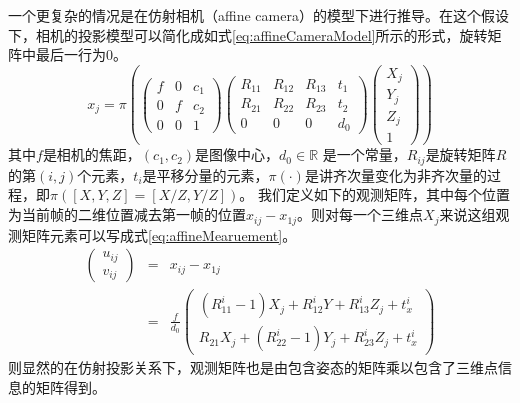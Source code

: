 一个更复杂的情况是在仿射相机（affine camera）的模型下进行推导\cite{wx-ref}。在这个假设下，相机的投影模型可以简化成如式\eqref{eq:affineCameraModel}所示的形式，旋转矩阵中最后一行为0。
\begin{equation}\label{eq:affineCameraModel}
x_j=\pi
(
\begin{pmatrix}
f & 0 & c_1\\
0 & f& c_2\\
0 & 0 &1
\end{pmatrix}
\begin{pmatrix}
R_{11} & R_{12} & R_{13} & t_1\\
R_{21} & R_{22} & R_{23} & t_2\\
0      & 0      & 0      & d_0
\end{pmatrix}
\begin{pmatrix}
X_j\\Y_j\\Z_j\\1
\end{pmatrix}
)
\end{equation}
其中$f$是相机的焦距，$(c_1,c_2)$是图像中心，$d_0\in \mathbb{R}$ 是一个常量，$R_{ij}$是旋转矩阵$R$的第$(i,j)$个元素，$t_i$是平移分量的元素，$\pi(\cdot)$是讲齐次量变化为非齐次量的过程，即$\pi([X,Y,Z]=[X/Z,Y/Z])$。
我们定义如下的观测矩阵，其中每个位置为当前帧的二维位置减去第一帧的位置$x_{ij}-x_{1j}$。则对每一个三维点$X_j$来说这组观测矩阵元素可以写成式\eqref{eq:affineMearuement}。
\begin{eqnarray}
\begin{pmatrix}
u_{ij}\\
v_{ij}
\end{pmatrix}
&=&
x_{ij}-x_{1j}\\
&=&\frac{f}{d_0}
\begin{pmatrix}
(R_{11}^i-1)X_{j}+R_{12}^i Y +R_{13}^i Z_j+t_x^i\\
R_{21}X_j + (R_{22}^i-1)Y_j+R_{23}^i Z_j+t_x^i
\end{pmatrix}
\end{eqnarray}
则显然的在仿射投影关系下，观测矩阵也是由包含姿态的矩阵乘以包含了三维点信息的矩阵得到。

